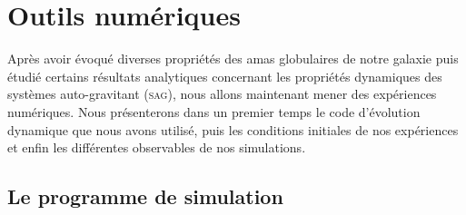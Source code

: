 \chapter{Outils numériques}
\label{Chap::Simu::Analysis}
	\minitoc

	Après avoir évoqué diverses propriétés des amas globulaires de notre galaxie puis étudié certains résultats
	analytiques concernant les propriétés dynamiques des systèmes auto-gravitant (\textsc{sag}), nous allons maintenant mener des
	expériences numériques. Nous présenterons dans un premier temps le code d'évolution dynamique que nous avons
	utilisé, puis les conditions initiales de nos expériences et enfin les différentes observables de nos simulations.





	\section{Le programme de simulation}

